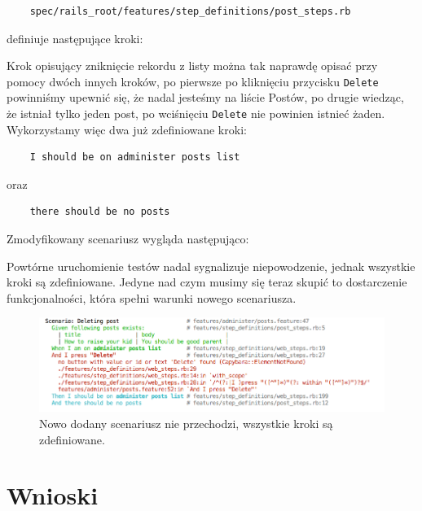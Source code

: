    \begin{lstlisting}
    spec/rails_root/features/step_definitions/post_steps.rb
    \end{lstlisting}
    
    definiuje następujące kroki:
    
    
    
    Krok opisujący zniknięcie rekordu z listy można tak naprawdę opisać przy pomocy dwóch innych kroków, po pierwsze po kliknięciu przycisku \verb+Delete+ powinniśmy upewnić się, że nadal jesteśmy na liście Postów, po drugie wiedząc, że istniał tylko jeden post, po wciśnięciu \verb+Delete+ nie powinien istnieć żaden. Wykorzystamy więc dwa już zdefiniowane kroki: 
    
    \begin{lstlisting}
    I should be on administer posts list
    \end{lstlisting}
    
    oraz 
    
    \begin{lstlisting}
    there should be no posts
    \end{lstlisting}
    
    Zmodyfikowany scenariusz wygląda następująco:
    
    
    
    Powtórne uruchomienie testów nadal sygnalizuje niepowodzenie, jednak wszystkie kroki są zdefiniowane. Jedyne nad czym musimy się teraz skupić to dostarczenie funkcjonalności, która spełni warunki nowego scenariusza.
     
     \clearpage
     
     \begin{figure}[!h]
   		\begin{center}
   			\includegraphics[width=\linewidth]{images/scenario_failure_2.png}
   			\caption{Nowo dodany scenariusz nie przechodzi, wszystkie kroki są zdefiniowane.}
   			\label{scenario_failure_2}
   		\end{center}
   	\end{figure}
  
  \section{Wnioski}
